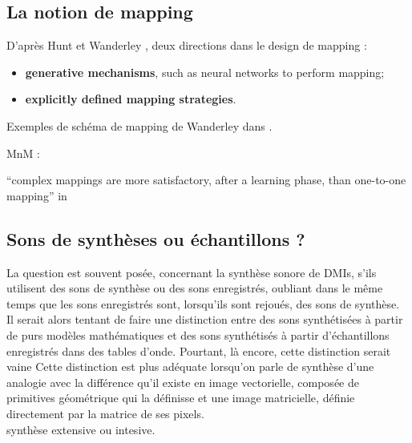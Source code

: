 \subsection{La notion de mapping}


\indent D'après Hunt et Wanderley \cite{hunt_mapping_2002}, deux directions dans le design de mapping :
\vspace{-1em}
\begin{itemize}[noitemsep]
	\item \textbf{generative mechanisms}, such as neural networks to perform mapping;
	\item \textbf{explicitly defined mapping strategies}.
\end{itemize}

Exemples de schéma de mapping de Wanderley dans \cite{wanderley_escher-modeling_1998}.

MnM : \cite{bevilacqua_mnm_2005}

``complex mappings are more satisfactory, after a learning phase, than one-to-one mapping'' in \cite{wanderley_mapping_2002}


\subsection{Sons de synthèses ou échantillons ?}

\noindent La question est souvent posée, concernant la synthèse sonore de \glspl{DMI}, s'ils utilisent des sons de synthèse ou des sons enregistrés, oubliant dans le même temps que les sons enregistrés sont, lorsqu'ils sont rejoués, des sons de synthèse.\\
\indent Il serait alors tentant de faire une distinction entre des sons synthétisées à partir de purs modèles mathématiques et des sons synthétisés à partir d'échantillons enregistrés dans des tables d'onde. Pourtant, là encore, cette distinction serait vaine
\indent Cette distinction est plus adéquate lorsqu'on parle de synthèse  d'une analogie avec la différence qu'il existe en image vectorielle, composée de primitives géométrique qui la définisse et une image matricielle, définie directement par la matrice de ses pixels.\\
synthèse extensive ou intesive.

